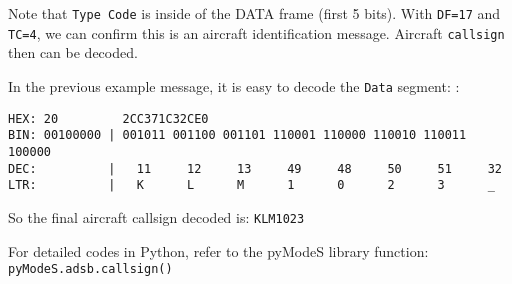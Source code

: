 Note that \texttt{Type\ Code} is inside of the DATA frame (first 5
bits). With \texttt{DF=17} and \texttt{TC=4}, we can confirm this is an
aircraft identification message. Aircraft \texttt{callsign} then can be
decoded.

In the previous example message, it is easy to decode the \texttt{Data}
segment: :

\begin{verbatim}
HEX: 20         2CC371C32CE0
BIN: 00100000 | 001011 001100 001101 110001 110000 110010 110011 100000
DEC:          |   11     12     13     49     48     50     51     32
LTR:          |   K      L      M      1      0      2      3      _
\end{verbatim}

So the final aircraft callsign decoded is: \texttt{KLM1023}

For detailed codes in Python, refer to the pyModeS library function:
\texttt{pyModeS.adsb.callsign()}
